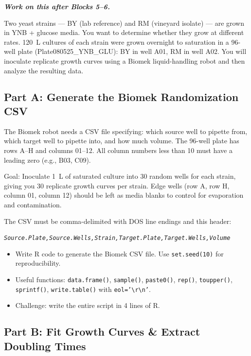 \textit{\textbf{Work on this after Blocks 5--6.}}

Two yeast strains --- BY (lab reference) and RM (vineyard isolate) --- are grown in YNB + glucose media. You want to determine whether they grow at different rates. 120~\textmu L cultures of each strain were grown overnight to saturation in a 96-well plate (Plate080525\_YNB\_GLU): BY in well A01, RM in well A02. You will inoculate replicate growth curves using a Biomek liquid-handling robot and then analyze the resulting data.

\subsection{Part A: Generate the Biomek Randomization CSV}

The Biomek robot needs a CSV file specifying: which source well to pipette from, which target well to pipette into, and how much volume. The 96-well plate has rows A--H and columns 01--12. All column numbers less than 10 must have a leading zero (e.g., B03, C09).

Goal: Inoculate 1~\textmu L of saturated culture into 30 random wells for each strain, giving you 30 replicate growth curves per strain. Edge wells (row A, row H, column 01, column 12) should be left as media blanks to control for evaporation and contamination.

The CSV must be comma-delimited with DOS line endings and this header:

\texttt{\textit{Source.Plate,Source.Wells,Strain,Target.Plate,Target.Wells,Volume}}

\begin{dobox}[Tasks]
\begin{itemize}[nosep]
  \item Write R code to generate the Biomek CSV file. Use \texttt{set.seed(10)} for reproducibility.
  \item Useful functions: \texttt{data.frame()}, \texttt{sample()}, \texttt{paste0()}, \texttt{rep()}, \texttt{toupper()}, \texttt{sprintf()}, \texttt{write.table()} with \texttt{eol='\textbackslash r\textbackslash n'}.
  \item Challenge: write the entire script in 4 lines of R.
\end{itemize}
\end{dobox}

\subsection{Part B: Fit Growth Curves \& Extract Doubling Times}

